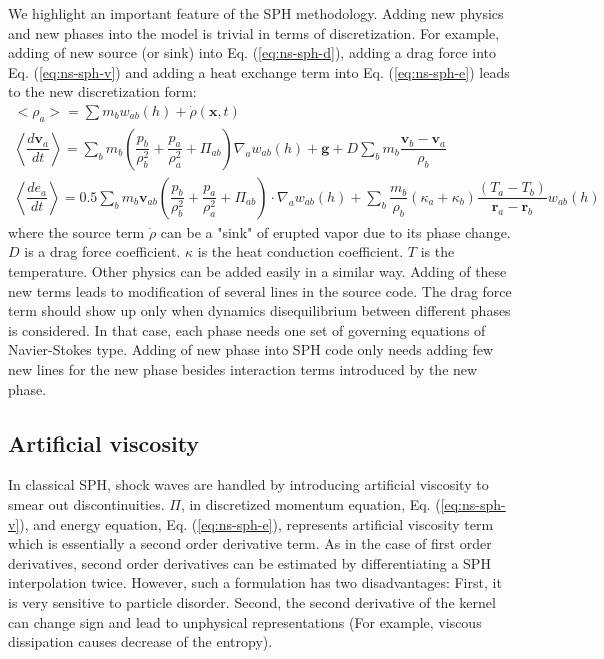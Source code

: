 \documentclass[journal abbreviation, manuscript]{copernicus}
\begin{document}
We highlight an important feature of the SPH methodology. Adding new physics and new phases into the model is trivial in terms of discretization. For example, adding of new source (or sink) into Eq. (\ref{eq:ns-sph-d}), adding a drag force into Eq. (\ref{eq:ns-sph-v})  and adding a heat exchange term into Eq. (\ref{eq:ns-sph-e}) leads to the new discretization form:
\begin{align}
<\rho_a> = \sum m_b w_{ab} \left(h\right) + \dot{\rho}\left(\textbf{x},t\right)\label{eq:ns-source-sph-d} \\
\left\langle\dfrac{d \textbf{v}_a}{d t}\right\rangle= \sum_b m_b \left(\dfrac{p_b}{\rho_b^2} + \dfrac{p_a}{\rho_a^2} + \Pi_{ab}\right) \nabla_a w_{a b}\left(h\right) +\textbf{g} + D \sum	_b m_b \dfrac{\textbf{v}_b - \textbf{v}_a}{\rho_b} \label{eq:ns-drag-sph-v} \\
\left\langle\dfrac{d e_a}{d t}\right\rangle=
 0.5\sum_b m_b \textbf{v}_{a b}\left(\dfrac{p_b}{\rho_b^2} + \dfrac{p_a}{\rho_a^2} + \Pi_{ab}\right) \cdot \nabla_a w_{a b}\left(h\right) + \sum_b \dfrac{m_b}{\rho_b}\left(\kappa_a + \kappa_b\right) \dfrac{\left(T_a - T_b\right)}{\textbf{r}_a - \textbf{r}_b} w_{ab}\left(h\right) \label{eq:ns-conduction-sph-e}
\end{align}
where the source term $\dot{\rho}$ can be a "sink" of erupted vapor due to its phase change.
$D$ is a drag force coefficient. $\kappa$ is the heat conduction coefficient. $T$ is the temperature. Other physics can be added easily in a similar way. Adding of these new terms leads to modification of several lines in the source code. The drag force term should show up only when dynamics disequilibrium between different phases is considered. In that case, each phase needs one set of governing equations of Navier-Stokes type. Adding of new phase into SPH code only needs adding few new lines for the new phase besides interaction terms introduced by the new phase.

\subsection{Artificial viscosity} \label{sec:artificial-viscosity}
In classical SPH, shock waves are handled by introducing artificial viscosity to smear out discontinuities. $\Pi$, in discretized momentum equation, Eq. (\ref{eq:ns-sph-v}), and energy equation, Eq. (\ref{eq:ns-sph-e}), represents artificial viscosity term which is essentially a second order derivative term. As in the case of first order derivatives, second order derivatives can be estimated by differentiating a SPH interpolation twice. However, such a formulation has two disadvantages: First, it is very sensitive to particle disorder. Second, the second derivative of the kernel can change sign and lead to unphysical representations (For example, viscous dissipation causes decrease of the entropy). 
\end{document}
